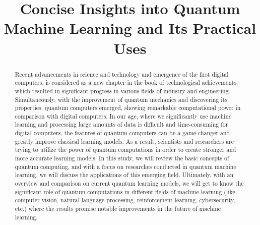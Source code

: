 \documentclass[conference]{IEEEtran}
\begin{document}
\title{Concise Insights into Quantum Machine Learning and Its Practical Uses}

\author{
\and
{}
}

\maketitle

\begin{abstract}
Recent advancements in science and technology and emergence of the first digital computers, is considered as a new chapter in the book of technological achievements, which resulted in significant progress in various fields of industry and engineering. Simultaneously, with the improvement of quantum mechanics and discovering its properties, quantum computers emerged, showing remarkable computational power in comparison with digital computers. In our age, where we significantly use machine learning and processing large amounts of data is difficult and time-consuming for digital computers, the features of quantum computers can be a game-changer and greatly improve classical learning models. As a result, scientists and researchers are trying to utilize the power of quantum computations in order to create stronger and more accurate learning models. In this study, we will review the basic concepts of quantum computing, and with a focus on researches conducted in quantum machine learning, we will discuss the applications of this emerging field. Ultimately, with an overview and comparison on current quantum learning models, we will get to know the significant role of quantum computations in different fields of machine learning (like computer vision, natural language processing, reinforcement learning, cybersecurity, etc.) where the results promise notable improvements in the future of machine learning.
\end{abstract}
\end{document}
